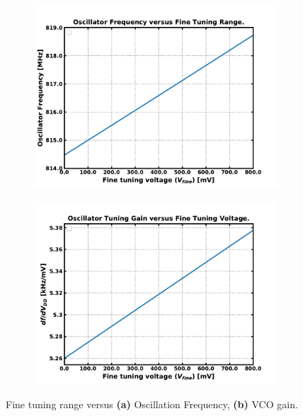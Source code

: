 	\begin{figure}[htb!]
	    \centering
	    \begin{subfigure}{0.5\textwidth}
	        \centering
	        \includegraphics[width=1\textwidth, angle=0]{./figs/results/osc_f_vs_fine}
	        \caption{ }
	        \label{fig:osc_f_vs_fine}
	    \end{subfigure}%
	    \begin{subfigure}{0.5\textwidth}
	        \centering
	        \includegraphics[width=1\textwidth, angle=0]{./figs/results/osc_f_gain_vs_fine}
	        \caption{ }
	        \label{fig:osc_f_gain_vs_fine}
	    \end{subfigure}
	    \label{fig:osc_f_fine_tune}
	    \caption{Fine tuning range versus \textbf{(a)} Oscillation Frequency, \textbf{(b)} VCO gain.}
	\end{figure} 

